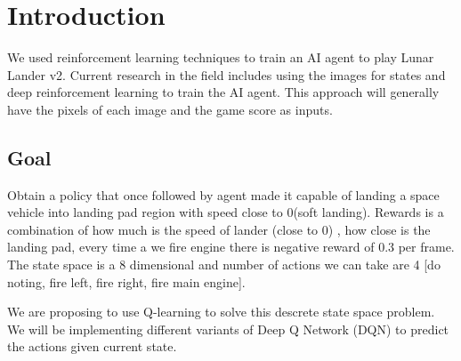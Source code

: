 \section{Introduction}
\label{intro}

We used reinforcement learning techniques to train an AI agent to play Lunar Lander v2. Current research in the field includes using the images for states and deep reinforcement learning to train the AI agent. This approach will generally have the pixels of each image and the game score as inputs.


\subsection{Goal}

Obtain a policy that once followed by agent made it capable of landing a space vehicle into landing pad region with speed close to 0(soft landing). Rewards is a combination of how much is the speed of lander (close to 0) , how close is the landing pad, every time a we fire engine there is negative reward of 0.3 per frame.  The state space is a 8 dimensional and number of actions we can take are 4 [do noting, fire left, fire right, fire main engine].

We are proposing to use Q-learning to solve this descrete state space problem. We will be implementing different variants of Deep Q Network (DQN) to predict the actions given current state.